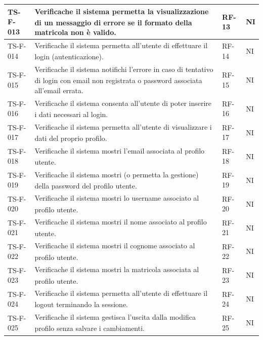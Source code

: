 \documentclass[a4paper,11pt]{article}
\renewcommand{\G}{\texorpdfstring{\textsubscript{\scalebox{0.6}{\textbf{G}}}\xspace}{ G}}
\begin{document}
\begin{longtable}{|p{2.2cm}|p{8.3cm}|p{2cm}|p{1.5cm}|}
TS-F-013 & Verifica\G che il sistema permetta la visualizzazione di un messaggio
di errore se il formato della matricola non è
valido. & RF-13 & NI \\ \hline
TS-F-014 & Verifica\G che il sistema permetta all'utente di effettuare il login (autenticazione). & RF-14 & NI \\ \hline
TS-F-015 & Verifica\G che il sistema notifichi l’errore in caso di
tentativo di login con email non registrata o password associata all'email errata. & RF-15 & NI \\ \hline
TS-F-016 & Verifica\G che il sistema consenta all'utente di poter inserire i dati necessari al login. & RF-16 & NI \\ \hline
TS-F-017 & Verifica\G che il sistema permetta all'utente di visualizzare i dati del proprio profilo. & RF-17 & NI \\ \hline
TS-F-018 & Verifica\G che il sistema mostri l’email associata al
profilo utente. & RF-18 & NI \\ \hline
TS-F-019 & Verifica\G che il sistema mostri (o permetta la
gestione) della password del profilo utente. & RF-19 & NI \\ \hline
TS-F-020 & Verifica\G che il sistema mostri lo username
associato al profilo utente. & RF-20 & NI \\ \hline
TS-F-021 & Verifica\G che il sistema mostri il nome associato
al profilo utente. & RF-21 & NI \\ \hline
TS-F-022 & Verifica\G che il sistema mostri il cognome associato
al profilo utente. & RF-22 & NI \\ \hline
TS-F-023 & Verifica\G che il sistema mostri la matricola associata
al profilo utente. & RF-23 & NI \\ \hline
TS-F-024 & Verifica\G che il sistema permetta all'utente di effettuare il logout terminando la sessione. & RF-24 & NI \\ \hline
TS-F-025 & Verifica\G che il sistema gestisca l’uscita dalla modifica profilo senza salvare i
cambiamenti. & RF-25 & NI \\ \hline


\end{longtable}
\end{document}
